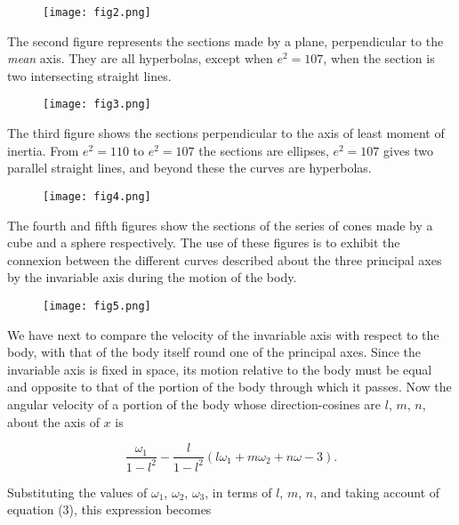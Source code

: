 \documentclass[12pt]{article}
\begin{document}
\begin{figure}
\texttt{[image: fig2.png]}
\caption{}
\end{figure}

\footnotemark[1]The second figure represents the sections made by a
plane, perpendicular to the \emph{mean} axis.  They are all
hyperbolas, except when $e^2= 107$, when the section is two
intersecting straight lines.

\begin{figure}
\texttt{[image: fig3.png]}
\caption{}
\end{figure}

The third figure shows the sections perpendicular to the axis of least
moment of inertia.  From $e^2 = 110$ to $e^2 = 107$ the sections are
ellipses, $e^2 = 107$ gives two parallel straight lines, and beyond
these the curves are hyperbolas.

\begin{figure}
\texttt{[image: fig4.png]}
\caption{}
\end{figure}

\footnotemark[1]The fourth and fifth figures show the sections of the
series of cones made by a cube and a sphere respectively.  The use of
these figures is to exhibit the connexion between the different curves
described about the three principal axes by the invariable axis during
the motion of the body.

\begin{figure}
\texttt{[image: fig5.png]}
\caption{}
\end{figure}

\footnotemark[1]We have next to compare the velocity of the invariable
axis with respect to the body, with that of the body itself round one
of the principal axes.  Since the invariable axis is fixed in space,
its motion relative to the body must be equal and opposite to that of
the portion of the body through which it passes.  Now the angular
velocity of a portion of the body whose direction-cosines are $l$,
$m$, $n$, about the axis of $x$ is

\begin{displaymath}
\frac{\omega_1}{1 - l^2} -
           \frac{l}{1 - l^2}(l\omega_1 + m\omega_2 + n\omega-3).
\end{displaymath}

Substituting the values of $\omega_1$, $\omega_2$, $\omega_3$, in
terms of $l$, $m$, $n$, and taking account of equation (3), this
expression becomes
\end{document}
